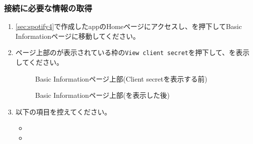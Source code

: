         \subsubsection{接続に必要な情報の取得}
        \label{sec:spotify5}
            \begin{enumerate}
                \item \ref{sec:spotify4}で作成したappのHomeページにアクセスし、を押下してBasic Informationページに移動してください。
                \label{item:spotify10}

                \item ページ上部の\clientId が表示されている枠の\texttt{View client secret}を押下して、\clientSecret を表示してください。
                \label{item:spotify11}
                    \begin{figure}[htbp]
                        \centering
                        \caption{Basic Informationページ上部(Client secretを表示する前)}
                        \label{img:spotify8}
                    \end{figure}
                    \begin{figure}[htbp]
                        \centering
                        \caption{Basic Informationページ上部(\clientSecret を表示した後)}
                        \label{img:spotify9}
                    \end{figure}

                \item 以下の項目を控えてください。
                \label{item:spotify12}
                    \begin{itemize}
                        \item \clientId
                        \item \clientSecret
                    \end{itemize}
            \end{enumerate}

